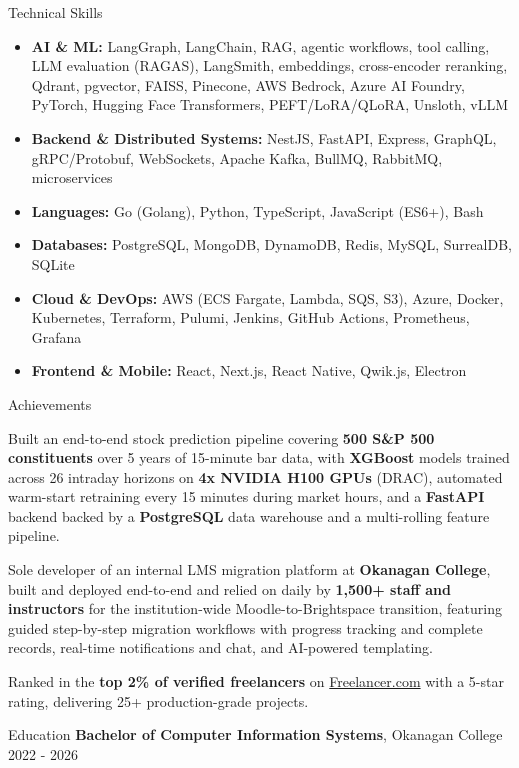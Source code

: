 \documentclass{resume}
\begin{document}
\begin{rSection}{Technical Skills}
\scriptsize
\begin{itemize}[leftmargin=0em,label={},itemsep=0pt,topsep=1pt,parsep=0pt,partopsep=0pt]
\item \textbf{AI \& ML:} LangGraph, LangChain, RAG, agentic workflows, tool calling, LLM evaluation (RAGAS), LangSmith, embeddings, cross-encoder reranking, Qdrant, pgvector, FAISS, Pinecone, AWS Bedrock, Azure AI Foundry, PyTorch, Hugging Face Transformers, PEFT/LoRA/QLoRA, Unsloth, vLLM
\item \textbf{Backend \& Distributed Systems:} NestJS, FastAPI, Express, GraphQL, gRPC/Protobuf, WebSockets, Apache Kafka, BullMQ, RabbitMQ, microservices
\item \textbf{Languages:} Go (Golang), Python, TypeScript, JavaScript (ES6+), Bash
\item \textbf{Databases:} PostgreSQL, MongoDB, DynamoDB, Redis, MySQL, SurrealDB, SQLite
\item \textbf{Cloud \& DevOps:} AWS (ECS Fargate, Lambda, SQS, S3), Azure, Docker, Kubernetes, Terraform, Pulumi, Jenkins, GitHub Actions, Prometheus, Grafana
\item \textbf{Frontend \& Mobile:} React, Next.js, React Native, Qwik.js, Electron
\end{itemize}
\end{rSection}\vspace{-0.5em}

\begin{rSection}{Achievements}
\scriptsize
\begin{jobitems}
    \item Built an end-to-end stock prediction pipeline covering \textbf{500 S\&P 500 constituents} over 5 years of 15-minute bar data, with \textbf{XGBoost} models trained across 26 intraday horizons on \textbf{4x NVIDIA H100 GPUs} (DRAC), automated warm-start retraining every 15 minutes during market hours, and a \textbf{FastAPI} backend backed by a \textbf{PostgreSQL} data warehouse and a multi-rolling feature pipeline.
    \item Sole developer of an internal LMS migration platform at \textbf{Okanagan College}, built and deployed end-to-end and relied on daily by \textbf{1,500+ staff and instructors} for the institution-wide Moodle-to-Brightspace transition, featuring guided step-by-step migration workflows with progress tracking and complete records, real-time notifications and chat, and AI-powered templating.
    \item Ranked in the \textbf{top 2\% of verified freelancers} on \href{https://www.freelancer.com/u/misterharshkumar}{Freelancer.com} with a 5-star rating, delivering 25+ production-grade projects.
\end{jobitems}
\end{rSection}\vspace{-0.5em}

\begin{rSection}{Education}
{\scriptsize \textbf{Bachelor of Computer Information Systems}, Okanagan College \hfill 2022 - 2026}
\end{rSection}
\end{document}
